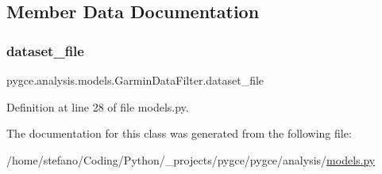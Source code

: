 \subsection{Member Data Documentation}
\mbox{\label{classpygce_1_1analysis_1_1models_1_1_garmin_data_filter_a7bb7be05577c2d31546e27823a5d11c5}} 
\subsubsection{\texorpdfstring{dataset\+\_\+file}{dataset\_file}}
{\footnotesize\ttfamily pygce.\+analysis.\+models.\+Garmin\+Data\+Filter.\+dataset\+\_\+file}



Definition at line 28 of file models.\+py.



The documentation for this class was generated from the following file\+:\begin{DoxyCompactItemize}
\item 
/home/stefano/\+Coding/\+Python/\+\_\+projects/pygce/pygce/analysis/\hyperlink{models_8py}{models.\+py}\end{DoxyCompactItemize}
